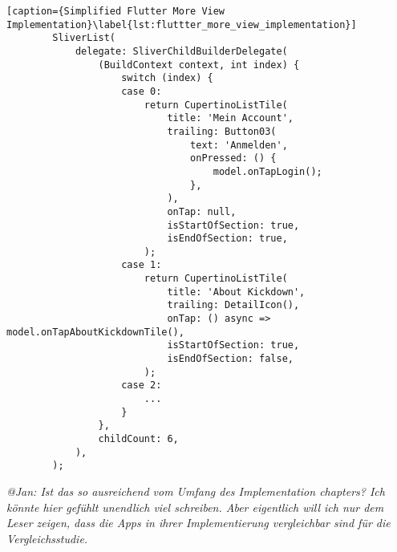 \begin{minipage}{\linewidth}
    \begin{lstlisting}[caption={Simplified Flutter More View Implementation}\label{lst:fluttter_more_view_implementation}]
        SliverList(
            delegate: SliverChildBuilderDelegate(
                (BuildContext context, int index) {
                    switch (index) {
                    case 0:
                        return CupertinoListTile(
                            title: 'Mein Account',
                            trailing: Button03(
                                text: 'Anmelden',
                                onPressed: () {
                                    model.onTapLogin();
                                },
                            ),
                            onTap: null,
                            isStartOfSection: true,
                            isEndOfSection: true,
                        );
                    case 1:
                        return CupertinoListTile(
                            title: 'About Kickdown',
                            trailing: DetailIcon(),
                            onTap: () async => model.onTapAboutKickdownTile(),
                            isStartOfSection: true,
                            isEndOfSection: false,
                        );
                    case 2:
                        ...
                    }
                },
                childCount: 6,
            ),
        );
    \end{lstlisting}
\end{minipage}



\textit{@Jan: Ist das so ausreichend vom Umfang des Implementation chapters? Ich könnte hier gefühlt unendlich viel schreiben. Aber eigentlich will ich nur dem Leser zeigen, dass die Apps in ihrer Implementierung vergleichbar sind für die Vergleichsstudie.}